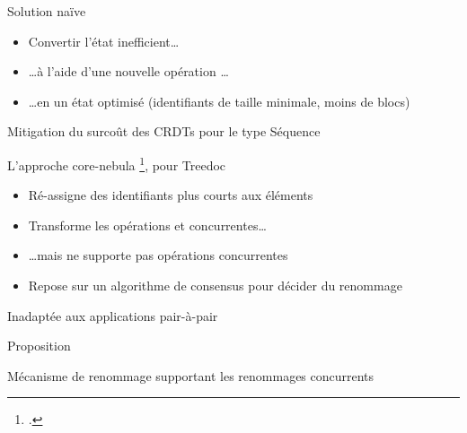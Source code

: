 \begin{frame}[fragile]{Solution naïve}
\begin{figure}
{
        }
      \end{figure}
      \begin{itemize}
        \item \alert{Convertir l'état} inefficient\dots
        \item<2-> \dots à l'aide d'une nouvelle opération \dots
        \item<3-> \dots \alert{en un état optimisé} (identifiants de taille minimale, moins de blocs)
      \end{itemize}
\end{frame}

\begin{frame}{Mitigation du surcoût des CRDTs pour le type Séquence}
    \begin{block}{L'approche core-nebula \footcite{zawirski:hal-01248197}, pour Treedoc}
        \begin{itemize}
            \item Ré-assigne des identifiants plus courts aux éléments
            \item Transforme les opérations \ins et \rmv concurrentes\dots
            \pause
            \item \dots mais ne supporte pas opérations \ren concurrentes
            \item Repose sur un algorithme de consensus pour décider du renommage
        \end{itemize}
    \end{block}
    \pause
    \begin{center}
        \alert{Inadaptée aux applications pair-à-pair}
    \end{center}
\end{frame}

\begin{frame}[standout]
    \alert{Proposition}

    Mécanisme de renommage supportant les renommages concurrents
\end{frame}
